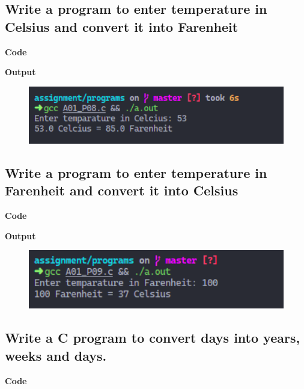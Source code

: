 \documentclass[a4paper]{article}
\begin{document}
\newpage



\subsection{Write a program to enter temperature in Celsius and convert it into Farenheit}
\textbf{Code}



\textbf{Output}

\begin{figure}[h]
  \includegraphics[width=12cm]{A01_P08}
\end{figure}

\newpage



\subsection{Write a program to enter temperature in Farenheit and convert it into Celsius}
\textbf{Code}



\textbf{Output}

\begin{figure}[h]
  \includegraphics[width=12cm]{A01_P09}
\end{figure}

\newpage



\subsection{Write a C program to convert days into years, weeks and days.}
\textbf{Code}
\end{document}
